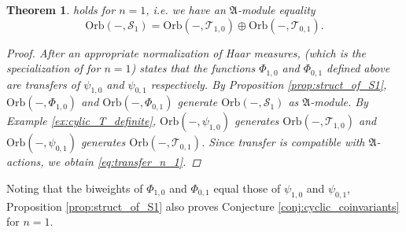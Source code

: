 \documentclass[reqno, 11pt]{amsart} %
\numberwithin{equation}{section}
\theoremstyle{plain}
\newtheorem{theorem}{Theorem}[section]
\theoremstyle{definition}
\theoremstyle{remark}
\newcommand{\mcS}{\mathcal{S}}
\newcommand{\mcT}{\mathcal{T}}
\newcommand{\mfA}{\mathfrak{A}}
\newcommand{\lie}[1]{ \mathfrak{#1}}
\newcommand{\Orb}{\mathrm{Orb}}
\begin{document}
\begin{theorem}  holds for $n=1$, i.e. we have an $\lie A$-module equality
\begin{equation}\label{eq:transfer_n_1}
\Orb(-,\mathcal S_1) =  \Orb(-,\mathcal T_{1,0}) \oplus \Orb(-,\mathcal T_{0,1}).
\end{equation}

\begin{proof}
 After an appropriate normalization of Haar measures, \cite[Example 4.16]{MSY} (which is the specialization of  for $n=1$) states that the functions $\Phi_{1,0}$ and $\Phi_{0,1}$ defined above are transfers of $\psi_{1,0}$ and $\psi_{0,1}$ respectively.
By Proposition \ref{prop:struct_of_S1}, $\Orb(-,Φ_{1,0})$ and $\Orb(-,Φ_{0,1})$ generate $\Orb(-,\mcS_1)$ as $\mfA$-module. By Example \ref{ex:cylic_T_definite}, $\Orb(-,ψ_{1,0})$ generates $\Orb(-,\mcT_{1,0})$ and $\Orb(-,ψ_{0,1})$ generates $\Orb(-,\mcT_{0,1})$. Since transfer is compatible with $\mfA$-actions, we obtain \eqref{eq:transfer_n_1}.
\end{proof}
\end{theorem}

Noting that the biweights of $Φ_{1,0}$ and $Φ_{0,1}$ equal those of $ψ_{1,0}$ and $ψ_{0,1}$, Proposition \ref{prop:struct_of_S1} also proves Conjecture \ref{conj:cyclic_coinvariants} for $n = 1$.
\end{document}
